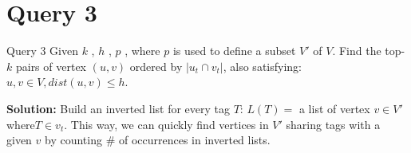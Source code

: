 
\section{Query 3}
\begin{frame}{Query 3}
Given $k$ , $h$ , $p$ , where $p$ is used to define a subset $V′$ of $V$. Find
the top-$k$ pairs of vertex $(u, v)$ ordered by $|u_t \cap v_t|$, also
satisfying: $u, v \in V,  dist (u, v) \le h$.

\textbf{Solution:} Build an inverted
list for every tag $T$: $L(T) = $ a list of vertex $v \in V′ $where$ T \in v_t $.
This way, we can quickly find vertices in $V′$ sharing tags with a
given $v$ by counting \# of occurrences in inverted lists.
\end{frame}
